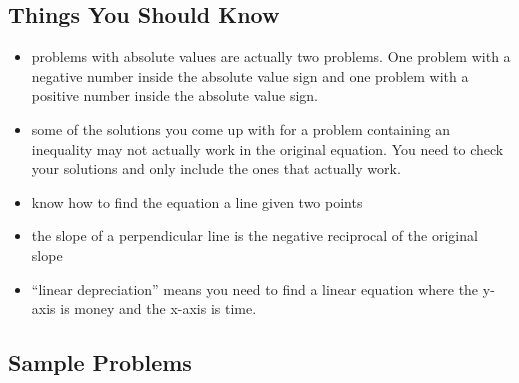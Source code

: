 \documentclass[fleqn,addpoints]{exam}
\begin{document}
\subsection{Things You Should Know}
\begin{itemize}
\item problems with absolute values are actually two problems.  One problem with a negative number inside the absolute
  value sign and one problem with a positive number inside the absolute value sign.
\item some of the solutions you come up with for a problem containing an inequality may not actually work in the original
  equation.  You need to check your solutions and only include the ones that actually work.
\item know how to find the equation a line given two points
\item the slope of a perpendicular line is the negative reciprocal of the original slope
\item ``linear depreciation'' means you need to find a linear equation where the y-axis is money and the x-axis is time.
\end{itemize}

\subsection{Sample Problems}
\end{document}
